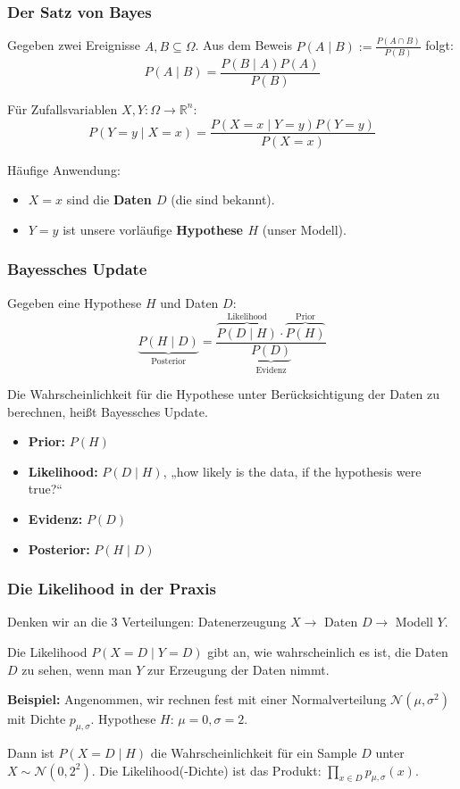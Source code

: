 \begin{frame}
  \frametitle{Der Satz von Bayes}
  Gegeben zwei Ereignisse $A, B \subseteq \Omega$. Aus dem Beweis $P(A \mid B) := \frac{P(A \cap B)}{P(B)}$ folgt:
  \[ P(A \mid B) = \frac{P(B \mid A) P(A)}{P(B)} \]

  \pause\vspace{0.5cm}
  Für Zufallsvariablen $X,Y \colon \Omega \to \mathbb{R}^n$:
  \[ P(Y=y \mid X=x) = \frac{P(X=x \mid Y=y) P(Y=y)}{P(X=x)} \]

  \pause\vspace{0.5cm}
  Häufige Anwendung:
  \begin{itemize}
    \item $X=x$ sind die \textbf{Daten $D$} (die sind bekannt).
    \item $Y=y$ ist unsere vorläufige \textbf{Hypothese $H$} (unser Modell).
  \end{itemize}
\end{frame}

\begin{frame}
  \frametitle{Bayessches Update}
  \vspace{-0.5cm}
  Gegeben eine Hypothese $H$ und Daten $D$:
  \[ \underbrace{P(H \mid D)}_{\text{Posterior}} = \frac{\overbrace{P(D \mid H)}^{\text{Likelihood}} \cdot \overbrace{P(H)}^{\text{Prior}}}{\underbrace{P(D)}_{\text{Evidenz}}} \]

  \pause\vspace{0.5cm}
  Die Wahrscheinlichkeit für die Hypothese unter Berücksichtigung der Daten zu berechnen, heißt \alert{Bayessches Update}.
  \begin{itemize}[<+->]
    \item \textbf{Prior:} $P(H)$
    \item \textbf{Likelihood:} $P(D \mid H)$, „how likely is the data, if the hypothesis were true?“
    \item \textbf{Evidenz:} $P(D)$
    \item \textbf{Posterior:} $P(H \mid D)$
  \end{itemize}
\end{frame}

\begin{frame}
  \frametitle{Die Likelihood in der Praxis}
  Denken wir an die 3 Verteilungen: Datenerzeugung $X \to$ Daten $D \to$ Modell $Y$.

      \vspace{0.3cm}
  Die Likelihood $P(X=D \mid Y=D)$ gibt an, wie wahrscheinlich es ist, die Daten $D$ zu sehen, wenn man $Y$ zur Erzeugung der Daten nimmt.

  \pause\vspace{0.5cm}
  \textbf{Beispiel:}
  Angenommen, wir rechnen fest mit einer Normalverteilung $\mathcal{N}(\mu, \sigma^2)$ mit Dichte $p_{\mu,\sigma}$.
  Hypothese $H$: $\mu=0, \sigma=2$.

      \vspace{0.3cm}
  Dann ist $P(X=D \mid H)$ die Wahrscheinlichkeit für ein Sample $D$ unter $X \sim \mathcal{N}(0, 2^2)$.
  Die Likelihood(-Dichte) ist das Produkt: $\prod_{x \in D} p_{\mu,\sigma}(x)$.
\end{frame}

